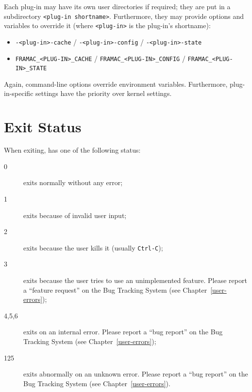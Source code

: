 Each \FramaC plug-in may have its own user directories if required; they are
put in a subdirectory \lstinline{<plug-in shortname>}. Furthermore, they may
provide options and variables to override it (where \lstinline{<plug-in>} is
the plug-in's shortname):
\begin{itemize}
\item \lstinline{-<plug-in>-cache} / \lstinline{-<plug-in>-config} /
  \lstinline{-<plug-in>-state}
\item \lstinline{FRAMAC_<PLUG-IN>_CACHE} / \lstinline{FRAMAC_<PLUG-IN>_CONFIG} /
  \lstinline{FRAMAC_<PLUG-IN>_STATE}
\end{itemize}

Again, command-line options override environment variables. Furthermore,
plug-in-specific settings have the priority over kernel settings.

\section{Exit Status}

When exiting, \FramaC has one of the following status:
\begin{description}
\item[0] \FramaC exits normally without any error;
\item[1] \FramaC exits because of invalid user input;
\item[2] \FramaC exits because the user kills it (usually \via \texttt{Ctrl-C});
\item[3] \FramaC exits because the user tries to use an unimplemented feature.
  Please report a ``feature request'' on the Bug Tracking System (see
  Chapter~\ref{user-errors});
\item[4,5,6] \FramaC exits on an internal error. Please report a ``bug report'' on
  the Bug Tracking System (see Chapter~\ref{user-errors});
\item[125] \FramaC exits abnormally on an unknown error. Please report a ``bug
  report'' on the Bug Tracking System (see Chapter~\ref{user-errors}).
\end{description}
